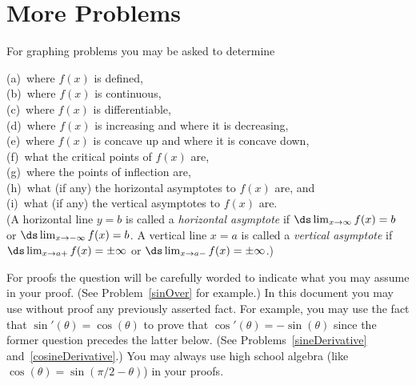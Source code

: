 \chapter{More Problems}
\problemfont

For graphing problems you may be asked to determine

\noindent
(a)~where $f(x)$ is defined,\\
(b)~where $f(x)$ is continuous,\\
(c)~where $f(x)$ is differentiable,\\
(d)~where $f(x)$ is increasing and where it is decreasing,\\
(e)~where $f(x)$ is concave up and where it is concave down,\\
(f)~what the critical points of $f(x)$ are,\\
(g)~where the points of inflection are,\\
(h)~what  (if any) the horizontal asymptotes to $f(x)$ are, and\\
(i)~what  (if any) the vertical asymptotes to $f(x)$ are.\\

\noindent
(A horizontal line $y=b$ is called a {\em horizontal asymptote} if
$\ds\lim_{x\to\infty}f(x)=b$ or $\ds\lim_{x\to-\infty}f(x)=b$.  A vertical
line $x=a$ is called a {\em vertical asymptote} if $\ds\lim_{x\to
a+}f(x)=\pm\infty$ or $\ds\lim_{x\to a-}f(x)=\pm\infty$.)


For proofs the question will be carefully worded to indicate what you may
assume in your proof.  (See Problem~\ref{sinOver} for example.)  In this
document you may use without proof any previously asserted fact. For
example, you may use the fact that $\sin'(\theta)=\cos(\theta)$ to prove
that $\cos'(\theta)=-\sin(\theta)$ since the former question precedes the
latter below.  (See Problems~\ref{sineDerivative}
and~\ref{cosineDerivative}.)  You may always use high school algebra (like
$\cos(\theta)=\sin(\pi/2-\theta)$) in your proofs.

